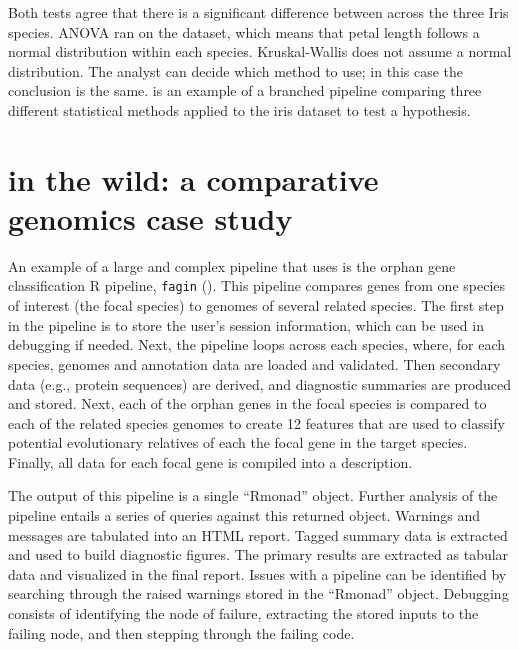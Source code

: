 Both tests agree that there is a significant difference between
 across the three Iris species. ANOVA ran on the dataset,
which means that petal length follows a normal distribution within each
species. Kruskal-Wallis does not assume a normal distribution. The analyst can
decide which method to use; in this case the conclusion is the same.
 is an example of a branched 
pipeline comparing three different statistical methods applied to the iris
dataset to test a hypothesis.

\section{ in the wild: a comparative genomics case study}

An example of a large and complex pipeline that uses  is the
orphan gene classification R pipeline, {\tt fagin}
\citep{arendsee2019fagin} (). This pipeline compares
genes from one species of interest (the focal species) to genomes of several
related species. The first step in the pipeline is to store the user's session
information, which can be used in debugging if needed. Next, the pipeline loops
across each species, where, for each species, genomes and annotation data are
loaded and validated.   Then secondary data (e.g., protein sequences) are
derived, and diagnostic summaries are produced and stored.  Next, each of the
orphan genes in the focal species is compared to each of the related species
genomes to create 12 features that are used to classify potential evolutionary
relatives of each the focal gene in the target species. Finally, all data for
each focal gene is compiled into a description.

The output of this pipeline is a single ``Rmonad'' object. Further analysis
of the pipeline entails a series of queries against this returned object.
Warnings and messages are tabulated into an HTML report. Tagged summary data is
extracted and used to build diagnostic figures. The primary results are
extracted as tabular data and visualized in the final report. Issues with a
pipeline can be identified by searching through the raised warnings stored in
the ``Rmonad'' object. Debugging consists of identifying the node of failure,
extracting the stored inputs to the failing node, and then stepping through the
failing code.

